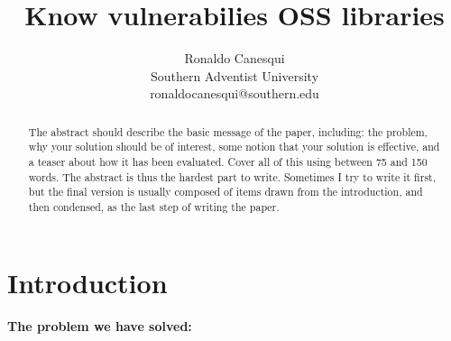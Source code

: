 \documentclass[pdf,bookmarks,colorlinks=true]{IEEEtran}
\title{\bf Know vulnerabilies OSS libraries}
\author{Ronaldo Canesqui\\
Southern Adventist University\\
ronaldocanesqui@southern.edu
}
\begin{document}
\maketitle

\begin{abstract}

The abstract should describe the basic message of the paper, including: the
problem, why your solution should be of interest, some notion that your
solution is effective, and a teaser about how it has been evaluated. Cover all
of this using between 75 and 150 words. The abstract is thus the hardest part
to write. Sometimes I try to write it first, but the final version is usually
composed of items drawn from the introduction, and then condensed, as the last
step of writing the paper.

\end{abstract}



\section{Introduction}
\label{sec:Introduction}

\textbf{The problem we have solved:}
\end{document}
